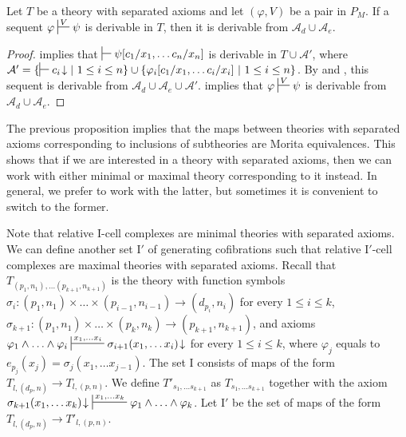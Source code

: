 \documentclass[reqno]{amsart}
\theoremstyle{definition}
\theoremstyle{remark}
\newcommand{\I}{\mathrm{I}}
\numberwithin{figure}{section}
\begin{document}
\begin{prop}
Let $T$ be a theory with separated axioms and let $(\varphi,V)$ be a pair in $P_M$.
If a sequent $\varphi \sststile{}{V} \psi$ is derivable in $T$, then it is derivable from $\mathcal{A}_d \cup \mathcal{A}_e$.
\end{prop}
\begin{proof}
 implies that $\sststile{}{} \psi[c_1/x_1, \ldots c_n/x_n]$ is derivable in $T \cup \mathcal{A}'$, where $\mathcal{A}' = \{ \sststile{}{} c_i\!\downarrow |\ 1 \leq i \leq n \} \cup \{ \varphi_i[c_1/x_1, \ldots c_i/x_i]\ |\ 1 \leq i \leq n \}$.
By  and , this sequent is derivable from $\mathcal{A}_d \cup \mathcal{A}_e \cup \mathcal{A}'$.
 implies that $\varphi \sststile{}{V} \psi$ is derivable from $\mathcal{A}_d \cup \mathcal{A}_e$.
\end{proof}

The previous proposition implies that the maps between theories with separated axioms corresponding to inclusions of subtheories are Morita equivalences.
This shows that if we are interested in a theory with separated axioms, then we can work with either minimal or maximal theory corresponding to it instead.
In general, we prefer to work with the latter, but sometimes it is convenient to switch to the former.

Note that relative $\I$-cell complexes are minimal theories with separated axioms.
We can define another set $\I'$ of generating cofibrations such that relative $\I'$-cell complexes are maximal theories with separated axioms.
Recall that $T_{(p_1,n_1), \ldots (p_{k+1},n_{k+1})}$ is the theory with function symbols $\sigma_i : (p_1,n_1) \times \ldots \times (p_{i-1},n_{i-1}) \to (d_{p_i},n_i)$ for every $1 \leq i \leq k$,
$\sigma_{k+1} : (p_1,n_1) \times \ldots \times (p_k,n_k) \to (p_{k+1},n_{k+1})$, and axioms $\varphi_1 \land \ldots \land \varphi_i \sststile{}{x_1, \ldots x_i} \sigma_{i+1}(x_1, \ldots x_i)\!\downarrow$ for every $1 \leq i \leq k$,
where $\varphi_j$ equals to $e_{p_j}(x_j) = \sigma_j(x_1, \ldots x_{j-1})$.
The set $\I$ consists of maps of the form $T_{l, (d_p,n)} \to T_{l, (p,n)}$.
We define $T'_{s_1, \ldots s_{k+1}}$ as $T_{s_1, \ldots s_{k+1}}$ together with the axiom $\sigma_{k+1}(x_1, \ldots x_k)\!\downarrow\ \sststile{}{x_1, \ldots x_k} \varphi_1 \land \ldots \land \varphi_k$.
Let $\I'$ be the set of maps of the form $T_{l, (d_p,n)} \to T'_{l, (p,n)}$.
\end{document}
